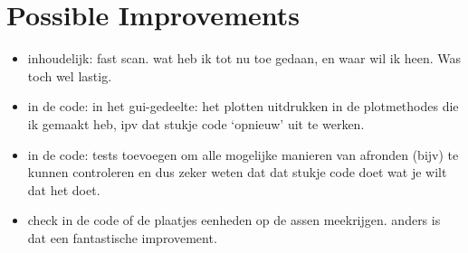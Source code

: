 
\section{Possible Improvements}
\begin{itemize}
\item inhoudelijk: fast scan. wat heb ik tot nu toe gedaan, en waar wil ik heen. Was toch wel lastig.
\item in de code: in het gui-gedeelte: het plotten uitdrukken in de plotmethodes die ik gemaakt heb, ipv dat stukje code `opnieuw' uit te werken.
\item in de code: tests toevoegen om alle mogelijke manieren van afronden (bijv) te kunnen controleren en dus zeker weten dat dat stukje code doet wat je wilt dat het doet.
\item check in de code of de plaatjes eenheden op de assen meekrijgen. anders is dat een fantastische improvement.
\end{itemize}



